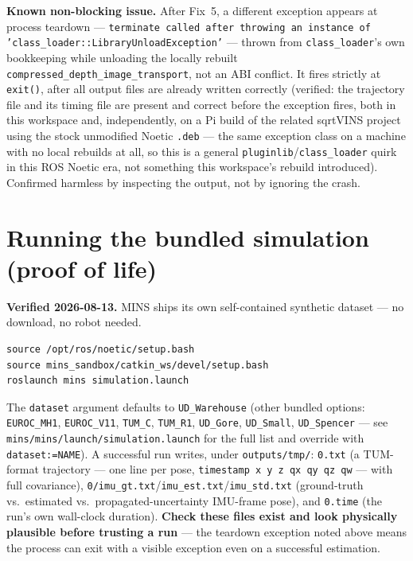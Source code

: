 \documentclass[11pt]{report}
\newenvironment{warningbox}%
  {\begin{lrbox}{\warnbox}\begin{minipage}{0.90\textwidth}}%
  {\end{minipage}\end{lrbox}%
   \begin{center}\fcolorbox{black}{codebg}{\usebox{\warnbox}}\end{center}}
\begin{document}
\begin{warningbox}
\textbf{Known non-blocking issue.} After Fix~5, a different
exception appears at process teardown --- \texttt{terminate called after
throwing an instance of 'class\_loader::LibraryUnloadException'} --- thrown
from \texttt{class\_loader}'s own bookkeeping while unloading the locally
rebuilt \texttt{compressed\_depth\_image\_transport}, not an ABI conflict.
It fires strictly at \texttt{exit()}, after all output files are already
written correctly (verified: the trajectory file and its timing file are
present and correct before the exception fires, both in this workspace and,
independently, on a Pi build of the related sqrtVINS project using the
stock unmodified Noetic \texttt{.deb} --- the same exception class on a
machine with no local rebuilds at all, so this is a general
\texttt{pluginlib}/\texttt{class\_loader} quirk in this ROS Noetic era, not
something this workspace's rebuild introduced). Confirmed harmless by
inspecting the output, not by ignoring the crash.
\end{warningbox}

\section{Running the bundled simulation (proof of life)}
\label{sec:mins-simulation}

\textbf{Verified 2026-08-13.} MINS ships its own self-contained synthetic
dataset --- no download, no robot needed.

\begin{lstlisting}[style=shell]
source /opt/ros/noetic/setup.bash
source mins_sandbox/catkin_ws/devel/setup.bash
roslaunch mins simulation.launch
\end{lstlisting}

The \texttt{dataset} argument defaults to \texttt{UD\_Warehouse} (other
bundled options: \texttt{EUROC\_MH1}, \texttt{EUROC\_V11}, \texttt{TUM\_C},
\texttt{TUM\_R1}, \texttt{UD\_Gore}, \texttt{UD\_Small}, \texttt{UD\_Spencer}
--- see \texttt{mins/mins/launch/simulation.launch} for the full list and
override with \texttt{dataset:=NAME}). A successful run writes, under
\texttt{outputs/tmp/}: \texttt{0.txt} (a TUM-format trajectory --- one line
per pose, \texttt{timestamp x y z qx qy qz qw} --- with full covariance),
\texttt{0/imu\_gt.txt}/\texttt{imu\_est.txt}/\texttt{imu\_std.txt}
(ground-truth vs.\ estimated vs.\ propagated-uncertainty IMU-frame pose),
and \texttt{0.time} (the run's own wall-clock duration). \textbf{Check these
files exist and look physically plausible before trusting a run} --- the
teardown exception noted above means the process can exit with a visible exception even on a
successful estimation.
\end{document}
